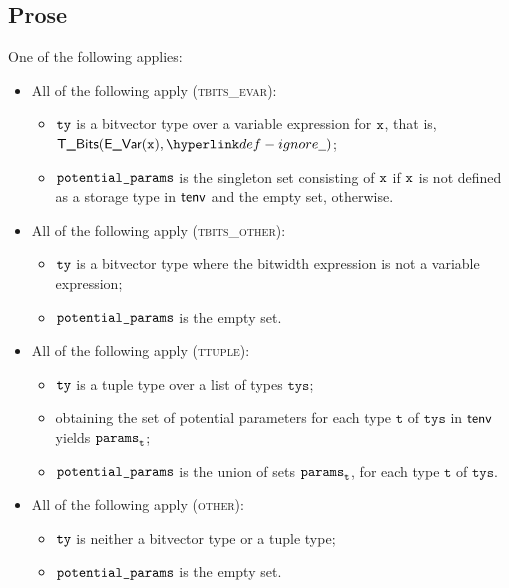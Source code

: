 \documentclass{book}
\newcommand\vt[0]{\texttt{t}}
\newcommand\tys[0]{\texttt{tys}}
\begin{document}
\subsection{Prose}
One of the following applies:
\begin{itemize}
  \item All of the following apply (\textsc{tbits\_evar}):
  \begin{itemize}
    \item $\texttt{ty}$ is a bitvector type over a variable expression for $\texttt{x}$, that is, \\ $\TBits(\EVar(\vx), \Ignore)$;
    \item $\texttt{potential\_params}$ is the singleton set consisting of $\texttt{x}$ if $\texttt{x}$ is not defined as a storage type in $\textsf{tenv}$
          and the empty set, otherwise.
  \end{itemize}

  \item All of the following apply (\textsc{tbits\_other}):
  \begin{itemize}
    \item $\texttt{ty}$ is a bitvector type where the bitwidth expression is not a variable expression;
    \item $\texttt{potential\_params}$ is the empty set.
  \end{itemize}

  \item All of the following apply (\textsc{ttuple}):
  \begin{itemize}
    \item $\texttt{ty}$ is a tuple type over a list of types $\tys$;
    \item obtaining the set of potential parameters for each type $\vt$ of $\tys$ in $\textsf{tenv}$ yields $\vparams_\vt$;
    \item $\texttt{potential\_params}$ is the union of sets $\vparams_\vt$, for each type $\vt$ of $\tys$.
  \end{itemize}

  \item All of the following apply (\textsc{other}):
  \begin{itemize}
    \item $\texttt{ty}$ is neither a bitvector type or a tuple type;
    \item $\texttt{potential\_params}$ is the empty set.
  \end{itemize}
\end{itemize}
\end{document}
